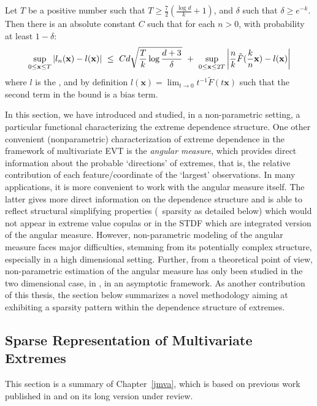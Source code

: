 \begin{theorem}
\label{thm:l}
Let $T$ be a positive number such that $T \ge \frac{7}{2}(\frac{\log d}{k} + 1)$, and $\delta$ such that $\delta \ge e^{-k}$. Then there is an absolute constant $C$ such that for each $n >0$, with probability at least $1-\delta$:
\begin{align*}
\sup_{0 \le \mathbf{x} \le T} \left| l_n(\mathbf{x}) - l(\mathbf{x})
\right| ~\le~ Cd\sqrt{\frac{T}{k}\log\frac{d+3}{\delta}} ~+~ \sup_{0
  \le \mathbf{x} \le 2T}\left|\frac{n}{k} \tilde
  F(\frac{k}{n}\mathbf{x})- %
l(\mb x)\right|
\end{align*}
where $l$ is the \stdf, and by definition $l(\mathbf{x})= \lim_{t \to 0} t^{-1} \tilde F (t\mathbf{x}) $ such that the second term in the bound is a bias term.
\end{theorem}


In this section, we have introduced and studied, in a non-parametric setting, a particular functional characterizing the extreme dependence structure.
%
One other convenient (nonparametric) characterization of  extreme dependence in the framework of multivariate EVT is the \textit{angular measure}, which provides direct information about the probable `directions' of extremes, that is, the relative contribution of each feature/coordinate of the `largest' observations.
%
In many applications, it is more convenient to work with the angular measure itself. The latter gives more direct information on the dependence structure and is able to reflect structural simplifying properties (\eg~sparsity as detailed below) which would not appear in extreme value copulas or in the STDF which are integrated version of the angular measure.
However, non-parametric modeling of the angular measure faces major difficulties, stemming from its potentially complex structure, especially in a high dimensional setting.
Further, from a theoretical point of view, non-parametric estimation of the angular measure has only been studied in the two dimensional case, in \cite{Einmahl2001, Einmahl2009}, in an asymptotic framework. As another contribution of this thesis, the section below summarizes a novel methodology %
aiming at exhibiting a sparsity pattern within the dependence structure of extremes.



\subsection{Sparse Representation of Multivariate Extremes}
\label{resume:sec:JMVA}
This section is a summary of Chapter~\ref{jmva}, which is based on previous work published in \cite{AISTAT16} and on its long version \cite{ARXIV16} under review.

